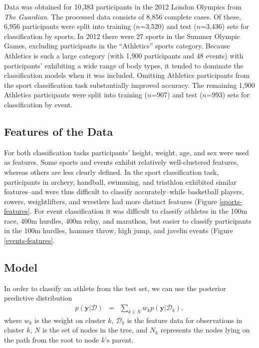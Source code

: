 \documentclass[12pt,letterpaper]{article} %
\begin{document}
Data was obtained for 10,383 participants in the 2012 London Olympics from \textit{The Guardian}. The processed data consists of 8,856 complete cases. Of these, 6,956 participants were split into training ($n$=3,520) and test ($n$=3,436) sets for classification by sports. In 2012 there were 27 sports in the Summer Olympic Games, excluding participants in the ``Athletics'' sports category. Because Athletics is such a large category (with 1,900 participants and 48 events) with participants' exhibiting a wide range of body types, it tended to dominate the classification models when it was included. Omitting Athletics participants from the sport classification task substantially improved accuracy. The remaining 1,900 Athletics participants were split into training ($n$=907) and test ($n$=993) sets for classification by event. 


\subsection{Features of the Data}

For both classification tasks participants' height, weight, age, and sex were used as features. Some sports and events exhibit relatively well-clustered features, whereas others are less clearly defined. In the sport classification task, participants in archery, handball, swimming, and triathlon exhibited similar features--and were thus difficult to classify accurately--while basketball players, rowers, weightlifters, and wrestlers had more distinct features (Figure \ref{sports-features}. For event classification it was difficult to classify athletes in the 100m race, 400m hurdles, 400m relay, and marathon, but easier to classify participants in the 100m hurdles, hammer throw, high jump, and javelin events (Figure \ref{events-features}. 




\subsection{Model}



In order to classify an athlete from the test set, we can use the posterior predictive distribution
\begin{eqnarray*}
p(\mathbf{y}|\mathcal{D}) &=& \sum_{k \in N} w_k p(\mathbf{y}|\mathcal{D}_k),
\end{eqnarray*}
where $w_k$ is the weight on cluster $k$, $\mathcal{D}_k$ is the feature data for observations in cluster $k$, $N$ is the set of nodes in the tree, and $N_k$ represents the nodes lying on the path from the root to node $k$'s parent. 
\end{document}
